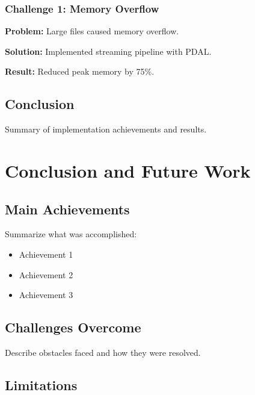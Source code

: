 \documentclass[12pt,a4paper,onecolumn,oneside]{report}
\begin{document}
\subsection{Challenge 1: Memory Overflow}

\textbf{Problem:} Large files caused memory overflow.

\textbf{Solution:} Implemented streaming pipeline with PDAL.

\textbf{Result:} Reduced peak memory by 75\%.

\section{Conclusion}
\label{sec:impl:conclusion}

Summary of implementation achievements and results.


\chapter{Conclusion and Future Work}
\label{chap:conclusion}

\section{Main Achievements}
\label{sec:conclusion:achievements}

Summarize what was accomplished:
\begin{itemize}
    \item Achievement 1
    \item Achievement 2
    \item Achievement 3
\end{itemize}

\section{Challenges Overcome}
\label{sec:conclusion:challenges}

Describe obstacles faced and how they were resolved.

\section{Limitations}
\label{sec:conclusion:limitations}
\end{document}
